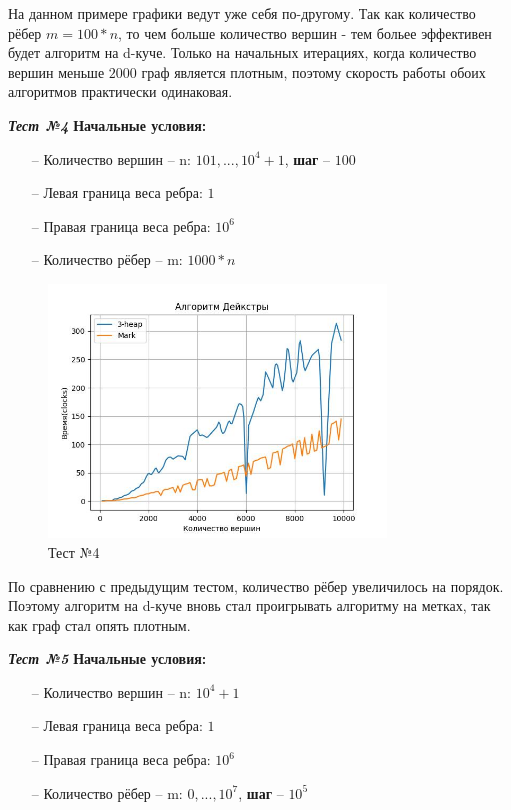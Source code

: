 \begin{text}
На данном примере графики ведут уже себя по-другому. Так как количество рёбер $m = 100*n$, то чем больше количество вершин - тем больее эффективен будет алгоритм на d-куче. Только на начальных итерациях, когда количество вершин меньше $2000$ граф является плотным, поэтому скорость работы обоих алгоритмов практически одинаковая.\\
\newpage

\begin{center}
\textbf{\textit{Тест №4}}
\textbf{Начальные условия:}

\begin{enumerate}
	\item[--] Количество вершин -- n: $101,...,10^4 + 1$, \textbf{шаг} -- $100$
	\item[--] Левая граница веса ребра: $1$
	\item[--] Правая граница веса ребра: $10^6$
	\item[--] Количество рёбер -- m: $1000*n$ 
\end{enumerate}

\end{center}
\begin{figure}[h]
  \centering
  \includegraphics[width=0.8\textwidth]{pictures/4.jpeg}
  \caption{Тест №4}
  \label{fig:pict_4}
\end{figure}

По сравнению с предыдущим тестом, количество рёбер увеличилось на порядок. Поэтому алгоритм на d-куче вновь стал проигрывать алгоритму на метках, так как граф стал опять плотным.\\
\newpage

\begin{center}
\textbf{\textit{Тест №5}}
\textbf{Начальные условия:}

\begin{enumerate}
	\item[--] Количество вершин -- n: $10^4 + 1$
	\item[--] Левая граница веса ребра: $1$
	\item[--] Правая граница веса ребра: $10^6$
	\item[--] Количество рёбер -- m: $0,...,10^7$, \textbf{шаг} -- $10^5$
\end{enumerate}


\end{center}
\end{text}
